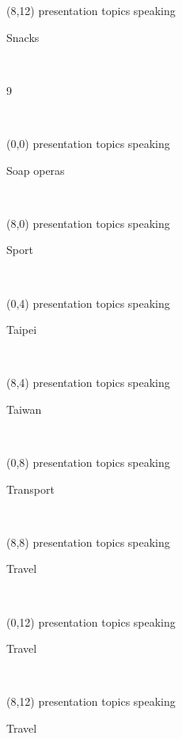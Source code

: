 \documentclass[a4paper]{article}
\newcommand{\mycard}[5]{%
	\small #1 #2
	\par
	\parbox[t][6.7cm][c]{9.5cm}{%
	\hspace{0.1cm} \Large#3\\
	\normalsize#4 #5
	}
}
\begin{document}
\begin{textblock}{8}(8,12)
\mycard{presentation topics}{speaking}{\parbox{9.0cm}{
\centering Snacks        
}}{}{} 
\end{textblock}

\begin{tiny}9\end{tiny}\\
\newpage

\begin{textblock}{8}(0,0)
\mycard{presentation topics}{speaking}{\parbox{9.0cm}{
\centering Soap operas 
}}{}{} 
\end{textblock}

\begin{textblock}{8}(8,0)
\mycard{presentation topics}{speaking}{\parbox{9.0cm}{
\centering Sport       
}}{}{} 
\end{textblock}

\begin{textblock}{8}(0,4)
\mycard{presentation topics}{speaking}{\parbox{9.0cm}{
\centering Taipei  
}}{}{} 
\end{textblock}

\begin{textblock}{8}(8,4)
\mycard{presentation topics}{speaking}{\parbox{9.0cm}{
\centering Taiwan  
}}{}{} 
\end{textblock}

\begin{textblock}{8}(0,8)
\mycard{presentation topics}{speaking}{\parbox{9.0cm}{
\centering Transport   
}}{}{} 
\end{textblock}

\begin{textblock}{8}(8,8)
\mycard{presentation topics}{speaking}{\parbox{9.0cm}{
\centering Travel     
}}{}{} 
\end{textblock}

\begin{textblock}{8}(0,12)
\mycard{presentation topics}{speaking}{\parbox{9.0cm}{
\centering Travel      
}}{}{} 
\end{textblock}

\begin{textblock}{8}(8,12)
\mycard{presentation topics}{speaking}{\parbox{9.0cm}{
\centering Travel       
}}{}{} 
\end{textblock}
\end{document}
